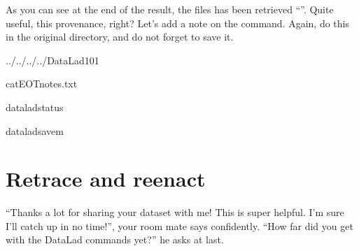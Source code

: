 \sphinxAtStartPar
As you can see at the end of the  result, the files has been retrieved “”.
Quite useful, this provenance, right?
Let’s add a note on the  command.
Again, do this in the original  directory, and do not forget to save it.

\begin{sphinxVerbatim}[commandchars=\\\{\}]
../../../../DataLad\PYGZhy{}101

cat\PYGZlt{}\PYGZlt{}EOT\PYGZgt{}\PYGZgt{}notes.txt

\end{sphinxVerbatim}

\begin{sphinxVerbatim}[commandchars=\\\{\}]
dataladstatus
\end{sphinxVerbatim}

\begin{sphinxVerbatim}[commandchars=\\\{\}]
dataladsave\PYGZhy{}m
\end{sphinxVerbatim}

\sphinxstepscope


\section{Retrace and reenact}
\label{\detokenize{basics/101-118-sharelocal3:retrace-and-reenact}}\label{\detokenize{basics/101-118-sharelocal3:sharelocal3}}\label{\detokenize{basics/101-118-sharelocal3::doc}}
\sphinxAtStartPar
“Thanks a lot for sharing your dataset with me! This
is super helpful. I’m sure I’ll catch up in no time!”,
your room mate says confidently. “How far did you get
with the DataLad commands yet?” he asks at last.

